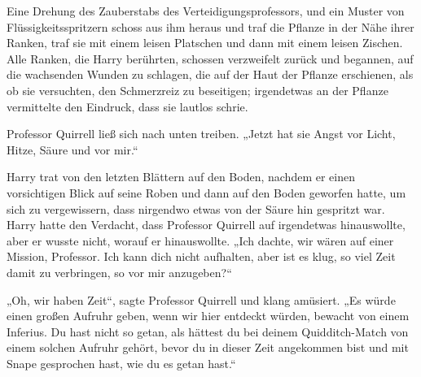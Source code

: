 Eine Drehung des Zauberstabs des Verteidigungsprofessors, und ein Muster von Flüssigkeitsspritzern schoss aus ihm heraus und traf die Pflanze in der Nähe ihrer Ranken, traf sie mit einem leisen Platschen und dann mit einem leisen Zischen.
Alle Ranken, die Harry berührten, schossen verzweifelt zurück und begannen, auf die wachsenden Wunden zu schlagen, die auf der Haut der Pflanze erschienen, als ob sie versuchten, den Schmerzreiz zu beseitigen; irgendetwas an der Pflanze vermittelte den Eindruck, dass sie lautlos schrie.

Professor Quirrell ließ sich nach unten treiben.
„Jetzt hat sie Angst vor Licht, Hitze, Säure und vor mir.“

Harry trat von den letzten Blättern auf den Boden, nachdem er einen vorsichtigen Blick auf seine Roben und dann auf den Boden geworfen hatte, um sich zu vergewissern, dass nirgendwo etwas von der Säure hin gespritzt war. Harry hatte den Verdacht, dass Professor Quirrell auf irgendetwas hinauswollte, aber er wusste nicht, worauf er hinauswollte.
„Ich dachte, wir wären auf einer Mission, Professor. Ich kann dich nicht aufhalten, aber ist es klug, so viel Zeit damit zu verbringen, so vor mir anzugeben?“

„Oh, wir haben Zeit“, sagte Professor Quirrell und klang amüsiert. „Es würde einen großen Aufruhr geben, wenn wir hier entdeckt würden, bewacht von einem Inferius. Du hast nicht so getan, als hättest du bei deinem Quidditch-Match von einem solchen Aufruhr gehört, bevor du in dieser Zeit angekommen bist und mit Snape gesprochen hast, wie du es getan hast.“

